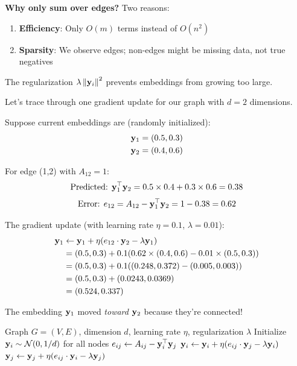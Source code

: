 \begin{notechapter}
\begin{intuition}
\textbf{Why only sum over edges?} Two reasons:
\begin{enumerate}
    \item \textbf{Efficiency}: Only $O(m)$ terms instead of $O(n^2)$
    \item \textbf{Sparsity}: We observe edges; non-edges might be missing data, not true negatives
\end{enumerate}
The regularization $\lambda \left\| \mathbf{y}_i \right\|^2$ prevents embeddings from growing too large.
\end{intuition}

\begin{example}
Let's trace through one gradient update for our graph with $d=2$ dimensions.

Suppose current embeddings are (randomly initialized):
\begin{align*}
\mathbf{y}_1 &= (0.5, 0.3) \\
\mathbf{y}_2 &= (0.4, 0.6)
\end{align*}

For edge (1,2) with $A_{12} = 1$:
\[
\text{Predicted: } \mathbf{y}_1^\top \mathbf{y}_2 = 0.5 \times 0.4 + 0.3 \times 0.6 = 0.38
\]
\[
\text{Error: } e_{12} = A_{12} - \mathbf{y}_1^\top \mathbf{y}_2 = 1 - 0.38 = 0.62
\]

The gradient update (with learning rate $\eta = 0.1$, $\lambda = 0.01$):
\begin{align*}
\mathbf{y}_1 &\leftarrow \mathbf{y}_1 + \eta(e_{12} \cdot \mathbf{y}_2 - \lambda \mathbf{y}_1) \\
&= (0.5, 0.3) + 0.1(0.62 \times (0.4, 0.6) - 0.01 \times (0.5, 0.3)) \\
&= (0.5, 0.3) + 0.1((0.248, 0.372) - (0.005, 0.003)) \\
&= (0.5, 0.3) + (0.0243, 0.0369) \\
&= (0.524, 0.337)
\end{align*}

The embedding $\mathbf{y}_1$ moved \emph{toward} $\mathbf{y}_2$ because they're connected!
\end{example}

\begin{algorithm}
\caption{Graph Factorization (Stochastic Gradient Descent)}
\begin{algorithmic}[1]
\Require Graph $G = (V, E)$, dimension $d$, learning rate $\eta$, regularization $\lambda$
\State Initialize $\mathbf{y}_i \sim \mathcal{N}(0, 1/d)$ for all nodes
        \State $e_{ij} \gets A_{ij} - \mathbf{y}_i^\top \mathbf{y}_j$ 
        \State $\mathbf{y}_i \gets \mathbf{y}_i + \eta(e_{ij} \cdot \mathbf{y}_j - \lambda \mathbf{y}_i)$
        \State $\mathbf{y}_j \gets \mathbf{y}_j + \eta(e_{ij} \cdot \mathbf{y}_i - \lambda \mathbf{y}_j)$
    \EndFor
\EndFor
\end{algorithmic}
\end{algorithm}


\end{notechapter}

